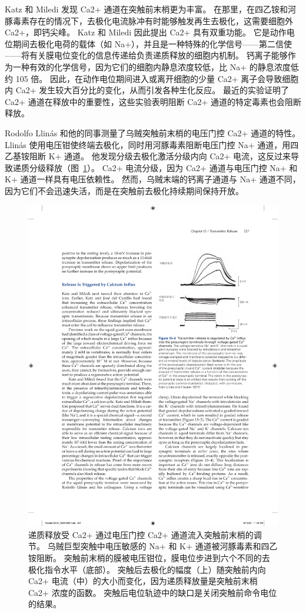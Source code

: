 Katz 和 Miledi 发现 Ca2+ 通道在突触前末梢更为丰富。
在那里，在四乙铵和河豚毒素存在的情况下，去极化电流脉冲有时能够触发再生去极化，这需要细胞外 Ca2+，即钙尖峰。
Katz 和 Miledi 因此提出 Ca2+ 具有双重功能。 它是动作电位期间去极化电荷的载体（如 Na+），并且是一种特殊的化学信号——第二信使——将有关膜电位变化的信息传递给负责递质释放的细胞内机制。
钙离子能够作为一种有效的化学信号，因为它们的细胞内静息浓度较低，比 Na+ 的静息浓度低约 105 倍。
因此，在动作电位期间进入或离开细胞的少量 Ca2+ 离子会导致细胞内 Ca2+ 发生较大百分比的变化，从而引发各种生化反应。
最近的实验证明了 Ca2+ 通道在释放中的重要性，这些实验表明阻断 Ca2+ 通道的特定毒素也会阻断释放。


Rodolfo Llinás 和他的同事测量了乌贼突触前末梢的电压门控 Ca2+ 通道的特性。
Llinás 使用电压钳使终端去极化，同时用河豚毒素阻断电压门控 Na+ 通道，用四乙基铵阻断 K+ 通道。
他发现分级去极化激活分级内向 Ca2+ 电流，这反过来导致递质分级释放（图~\ref{fig:15_3}）。 
Ca2+ 电流分级，因为 Ca2+ 通道与电压门控 Na+ 和 K+ 通道一样具有电压依赖性。
然而，乌贼末端的钙离子通道与 Na+ 通道不同，因为它们不会迅速失活，而是在突触前去极化持续期间保持开放。


\begin{figure}[htbp]
	\centering
	\includegraphics[width=0.5\linewidth]{chap15/fig_15_3}
	\caption{递质释放受 Ca2+ 通过电压门控 Ca2+ 通道流入突触前末梢的调节。
	乌贼巨型突触中电压敏感的 Na+ 和 K+ 通道被河豚毒素和四乙铵阻断。
	突触前末梢的膜被电压钳位，膜电位步进到六个不同的去极化指令水平（底部）。
	突触后去极化的幅度（上）随突触前内向 Ca2+ 电流（中）的大小而变化，因为递质释放量是突触前末梢 Ca2+ 浓度的函数。
	突触后电位轨迹中的缺口是关闭突触前命令电位的结果\cite{llinas1977depolarization}。}
	\label{fig:15_3}
\end{figure}


